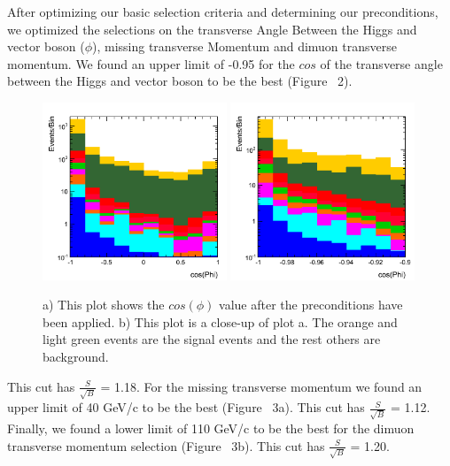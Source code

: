 \documentclass[12pt]{article}
\begin{document}
After optimizing our basic selection criteria and determining our preconditions, 
we optimized the selections on the transverse Angle Between the Higgs and vector boson ($\phi$), missing transverse Momentum and dimuon transverse momentum. 
We found an upper limit of -0.95 for the $cos$ of the transverse angle between the Higgs and vector boson to be the best (Figure ~2). 
\begin{figure}[!hbtp]
\begin{center}
    \includegraphics[width=0.49\textwidth]{images/Hist_MuMu2JetPhiBeforeCuts.png} %
    \includegraphics[width=0.49\textwidth]{images/Hist_MuMu2JetPhiZoomB4Cut.png}
    \caption{ \label{fig:myfigurelabel}
         a) This plot shows the $cos(\phi)$ value after the preconditions have been applied. b) This plot is a close-up of plot a.
	 The orange and light green events are the signal events and the rest others are background.
      }
\end{center}
\end{figure} 
This cut has $\frac{S}{\sqrt{B}}$ = 1.18. For the missing transverse momentum we found an upper limit of 40 GeV/c to be the best (Figure ~3a).
This cut has $\frac{S}{\sqrt{B}}$ = 1.12. Finally, we found a lower limit of 110 GeV/c to be the best for the dimuon transverse momentum selection 
(Figure ~3b). This cut has $\frac{S}{\sqrt{B}}$ = 1.20.
\end{document}
